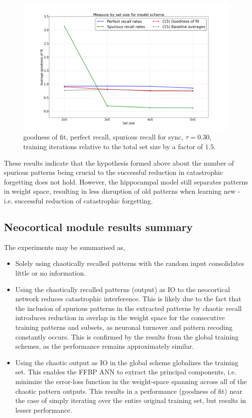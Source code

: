 \begin{figure}
    \centering
    \includegraphics[width=13cm]{fig/hypothesis-test-sync/combined-measures-sync-tm1-tr30-relative-iters}
    \caption{goodness of fit, perfect recall, spurious recall for sync, $\tau=0.30$, training iterations relative to the total set size by a factor of $1.5$.}
    \label{fig:combined-measures-sync-tm1-tr30-relative-iters}
\end{figure}

These results indicate that the hypothesis formed above about the number of spurious patterns being crucial to the successful reduction in catastrophic forgetting does not hold. However, the hippocampal model still separates patterns in weight space, resulting in less disruption of old patterns when learning new - i.e. successful reduction of catastrophic forgetting.



\subsection{Neocortical module results summary}

The experiments may be summarised as,
\begin{itemize}
    \item Solely using chaotically recalled patterns with the random input consolidates little or no information.
    \item Using the chaotically recalled patterns (output) as IO to the neocortical network reduces catastrophic interference. This is likely due to the fact that the inclusion of spurious patterns in the extracted patterns by chaotic recall introduces reduction in overlap in the weight space for the consecutive training patterns and subsets, as neuronal turnover and pattern recoding constantly occurs. This is confirmed by the results from the global training schemes, as the performance remains approximately similar.
    \item Using the chaotic output as IO in the global scheme globalizes the training set. This enables the FFBP ANN to extract the principal components, i.e. minimize the error-loss function in the weight-space spanning across all of the chaotic pattern outputs. This results in a performance (goodness of fit) near the case of simply iterating over the entire original training set, but results in lesser performance.
\end{itemize}

